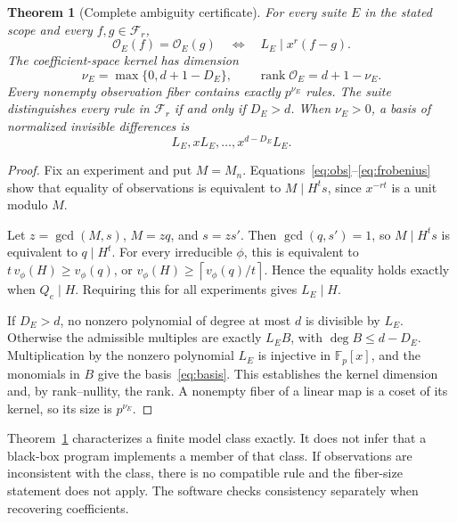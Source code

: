 \documentclass[11pt]{article}
\newtheorem{theorem}{Theorem}
\newcommand{\Fp}{\mathbb F_p}
\newcommand{\Obs}{\mathcal O}
\newcommand{\rank}{\operatorname{rank}}
\newcommand{\ceil}[1]{\left\lceil #1\right\rceil}
\begin{document}
\begin{theorem}[Complete ambiguity certificate]\label{thm:main}
For every suite $E$ in the stated scope and every $f,g\in\mathcal F_r$,
\begin{equation}
 \Obs_E(f)=\Obs_E(g)
 \quad\Longleftrightarrow\quad L_E\mid x^r(f-g).
 \label{eq:equiv}
\end{equation}
The coefficient-space kernel has dimension
\begin{equation}
 \nu_E=\max\{0,d+1-D_E\},
 \qquad \rank\Obs_E=d+1-\nu_E.
 \label{eq:rank}
\end{equation}
Every nonempty observation fiber contains exactly $p^{\nu_E}$ rules. The suite distinguishes every rule in $\mathcal F_r$ if and only if $D_E>d$. When $\nu_E>0$, a basis of normalized invisible differences is
\begin{equation}
 L_E,xL_E,\ldots,x^{d-D_E}L_E.
 \label{eq:basis}
\end{equation}
\end{theorem}
\begin{proof}
Fix an experiment and put $M=M_n$. Equations~\eqref{eq:obs}--\eqref{eq:frobenius} show that equality of observations is equivalent to $M\mid H^t s$, since $x^{-rt}$ is a unit modulo $M$.

Let $z=\gcd(M,s)$, $M=zq$, and $s=zs'$. Then $\gcd(q,s')=1$, so $M\mid H^t s$ is equivalent to $q\mid H^t$. For every irreducible $\phi$, this is equivalent to $t\,v_\phi(H)\geq v_\phi(q)$, or $v_\phi(H)\geq\ceil{v_\phi(q)/t}$. Hence the equality holds exactly when $Q_e\mid H$. Requiring this for all experiments gives $L_E\mid H$.

If $D_E>d$, no nonzero polynomial of degree at most $d$ is divisible by $L_E$. Otherwise the admissible multiples are exactly $L_E B$, with $\deg B\leq d-D_E$. Multiplication by the nonzero polynomial $L_E$ is injective in $\Fp[x]$, and the monomials in $B$ give the basis~\eqref{eq:basis}. This establishes the kernel dimension and, by rank--nullity, the rank. A nonempty fiber of a linear map is a coset of its kernel, so its size is $p^{\nu_E}$.
\end{proof}

Theorem~\ref{thm:main} characterizes a finite model class exactly. It does not infer that a black-box program implements a member of that class. If observations are inconsistent with the class, there is no compatible rule and the fiber-size statement does not apply. The software checks consistency separately when recovering coefficients.
\end{document}
